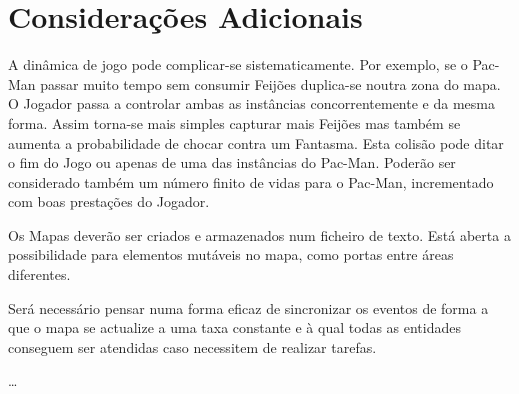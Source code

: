 \documentclass{article}
\begin{document}
\section{Considerações Adicionais}
A dinâmica de jogo pode complicar-se sistematicamente. Por exemplo, se o
Pac-Man passar muito tempo sem consumir Feijões duplica-se noutra zona do mapa.
O Jogador passa a controlar ambas as instâncias concorrentemente e da mesma
forma. Assim torna-se mais simples capturar mais Feijões mas também se aumenta
a probabilidade de chocar contra um Fantasma. Esta colisão pode ditar o fim do
Jogo ou apenas de uma das instâncias do Pac-Man. Poderão ser considerado também
um número finito de vidas para o Pac-Man, incrementado com boas prestações do
Jogador.

Os Mapas deverão ser criados e armazenados num ficheiro de texto. Está aberta a
possibilidade para elementos mutáveis no mapa, como portas entre áreas
diferentes.

Será necessário pensar numa forma eficaz de sincronizar os eventos de forma a
que o mapa se actualize a uma taxa constante e à qual todas as entidades
conseguem ser atendidas caso necessitem de realizar tarefas.

\ldots
\end{document}
